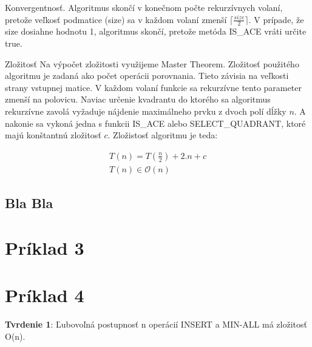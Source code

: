 \documentclass[paper=a4, fontsize=11pt]{scrartcl} %
\numberwithin{equation}{section} %
\numberwithin{figure}{section} %
\numberwithin{table}{section} %
\begin{document}
Konvergentnosť.
Algoritmus skončí v konečnom počte rekurzívnych volaní, pretože veľkosť podmatice (size) sa v každom volaní zmenší $\lceil \frac{size}{2} \rceil$. V prípade, že size dosiahne hodnotu 1, algoritmus skončí, pretože metóda IS\_ACE vráti určite true.

Zložitosť
Na výpočet zložitosti využijeme Master Theorem. Zložitosť použitého algoritmu je zadaná ako počet operácii porovnania. Tieto závisia na veľkosti strany vstupnej matice. V každom volaní funkcie  sa rekurzívne tento parameter zmenší na polovicu.
Naviac určenie kvadrantu do ktorého sa algoritmus rekurzívne zavolá vyžaduje nájdenie maximálneho prvku z dvoch polí dĺžky $n$. A nakonie sa vykoná jedna s funkcii IS\_ACE alebo SELECT\_QUADRANT, ktoré majú konštantnú zložitosť $c$. Zložistosť algoritmu je teda:

\begin{equation}
    \begin{aligned}
        T(n) = T\left(\frac{n}{2}\right) + 2.n + c \\
        T(n) \in \mathcal{O}(n)
    \end{aligned}
\end{equation}


\subsection{Bla Bla}



\pagebreak

\section*{Príklad 3}

\pagebreak

\section*{Príklad 4}

\textbf{Tvrdenie 1}: Ľubovoľná postupnosť n operácií INSERT  a MIN-ALL má zložitosť O(n). \\
\end{document}
